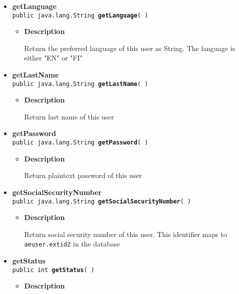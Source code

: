 {{{\begin{itemize}
{\begin{itemize}
{Return first name of this user
}
\end{itemize}
}%
 \item{ 
{\bf getLanguage}\\
{\tt public java.lang.String\ {\bf getLanguage}(  )
\label{fi.helsinki.cs.kohahdus.User.getLanguage()}}%
\begin{itemize}
\item{
{\bf Description}

Return the preferred language of this user as String. The language is either "EN" or "FI"
}
\end{itemize}
}%
 \item{ 
{\bf getLastName}\\
{\tt public java.lang.String\ {\bf getLastName}(  )
\label{fi.helsinki.cs.kohahdus.User.getLastName()}}%
\begin{itemize}
\item{
{\bf Description}

Return last name of this user
}
\end{itemize}
}%
 \item{ 
{\bf getPassword}\\
{\tt public java.lang.String\ {\bf getPassword}(  )
\label{fi.helsinki.cs.kohahdus.User.getPassword()}}%
\begin{itemize}
\item{
{\bf Description}

Return plaintext password of this user
}
\end{itemize}
}%
 \item{ 
{\bf getSocialSecurityNumber}\\
{\tt public java.lang.String\ {\bf getSocialSecurityNumber}(  )
\label{fi.helsinki.cs.kohahdus.User.getSocialSecurityNumber()}}%
\begin{itemize}
\item{
{\bf Description}

Return social security number of this user. This identifier maps to {\tt\small aeuser.extid2} in the database
}
\end{itemize}
}%
 \item{ 
{\bf getStatus}\\
{\tt public int\ {\bf getStatus}(  )
\label{fi.helsinki.cs.kohahdus.User.getStatus()}}%
\begin{itemize}
\item{
{\bf Description}

}
\end{itemize}}
\end{itemize}}}}
